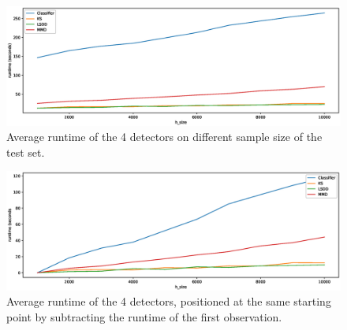 \documentclass[12pt]{report}
\begin{document}










\begin{figure}[h]
\includegraphics[width=\linewidth]{images/ALL-detectors-runtime}
\caption{Average runtime of the 4 detectors on different sample size of the test set.}
\label{fig:runtime}
\end{figure}

\begin{figure}[h]
    \includegraphics[width=\linewidth]{images/ALL-detectors-zeroed-runtime}
    \caption{Average runtime of the 4 detectors, positioned at the same starting point by subtracting the runtime of the first observation.}
    \label{fig:runtime_zeroed}
\end{figure}
\end{document}
